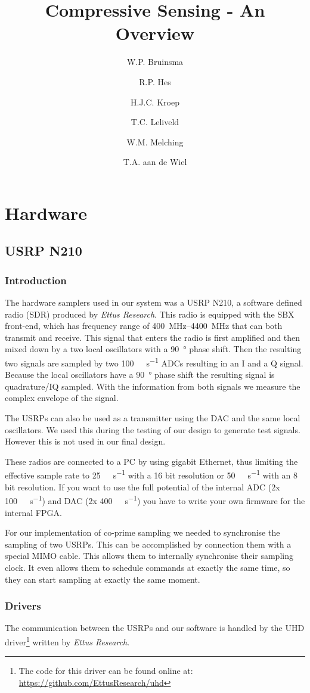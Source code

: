 \documentclass[a4paper, openany, oneside]{memoir}
\title{Compressive Sensing - An Overview}
\author{W.P. Bruinsma \and R.P. Hes \and H.J.C. Kroep \and T.C. Leliveld \and W.M. Melching \and T.A. aan de Wiel}
\begin{document}
\chapter{Hardware}

\section{USRP N210}
\label{sec:usrp-n210}

\subsection{Introduction}
\label{sec:introduction}
The hardware samplers used in our system was a USRP N210, a software defined radio (SDR) produced by \textit{Ettus Research}. This radio is equipped with the SBX front-end, which has frequency range of \SIrange{400}{4400}{\mega\hertz} that can both transmit and receive. This signal that enters the radio is first amplified and then mixed down by a two local oscillators with a \SI{90}{\degree} phase shift. Then the resulting two signals are sampled by two \SI{100}{\mega\sample\per\second} ADCs resulting in an I and a Q signal. Because the local oscillators have a \SI{90}{\degree} phase shift the resulting signal is quadrature/IQ sampled. With the information from both signals we measure the complex envelope of the signal.

The USRPs can also be used as a transmitter using the DAC and the same local oscillators. We used this during the testing of our design to generate test signals. However this is not used in our final design.

These radios are connected to a PC by using gigabit Ethernet, thus limiting the effective sample rate to \SI{25}{\mega\sample\per\second} with a 16 bit resolution or \SI{50}{\mega\sample\per\second} with an 8 bit resolution. If you want to use the full potential of the internal ADC (2x \SI{100}{\mega\sample\per\second}) and DAC (2x \SI{400}{\mega\sample\per\second}) you have to write your own firmware for the internal FPGA\@.

For our implementation of co-prime sampling we needed to synchronise the sampling of two USRPs. This can be accomplished by connection them with a special MIMO cable. This allows them to internally synchronise their sampling clock. It even allows them to schedule commands at exactly the same time, so they can start sampling at exactly the same moment.

\subsection{Drivers}
\label{sec:drivers}
The communication between the USRPs and our software is handled by the UHD driver\footnote{The code for this driver can be found online at: \url{https://github.com/EttusResearch/uhd}} written by \textit{Ettus Research}.
\end{document}
